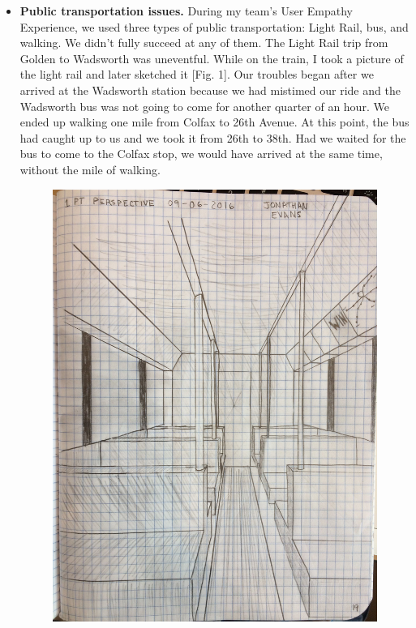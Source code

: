 \documentclass[11pt]{article}
\begin{document}
\begin{itemize}
    \item \textbf{Public transportation issues.} During my team's User Empathy Experience, we
        used three types of public transportation: Light Rail, bus, and walking. We didn't fully
        succeed at any of them. The Light Rail trip from Golden to Wadsworth was uneventful. While
        on the train, I took a picture of the light rail and later sketched it [Fig. 1]. Our
        troubles began after we arrived at the Wadsworth station because we had mistimed our ride
        and the Wadsworth bus was not going to come for another quarter of an hour. We ended up
        walking one mile from Colfax to 26th Avenue. At this point, the bus had caught
        up to us and we took it from 26th to 38th. Had we waited for the bus to come to the Colfax
        stop, we would have arrived at the same time, without the mile of walking.\\
        \begin{figure}[p]
            \centering
            \includegraphics[width=160mm]{resources/light-rail-sketch.jpg}

\end{figure}
\end{itemize}
\end{document}
